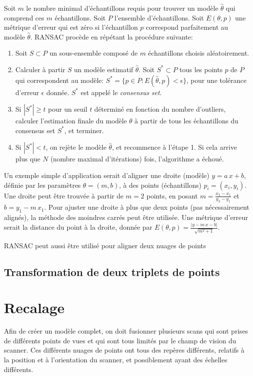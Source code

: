 \documentclass[a4paper,10pt]{scrreprt}
\begin{document}
Soit $m$ le nombre minimal d'échantillons requis pour trouver un modèle $\hat{\theta}$ qui comprend ces $m$ échantillons. Soit $P$ l'ensemble d'échantillons. Soit $E(\theta, p)$ une métrique d'erreur qui est zéro si l'échantillon $p$ correspond parfaitement au modèle $\hat{\theta}$. RANSAC procède en répétant la procédure suivante:
\begin{enumerate}
	\item Soit $S \subset P$ un sous-ensemble composé de $m$ échantillons choisis aléatoirement.
	\item Calculer à partir $S$ un modèle estimatif $\hat{\theta}$. Soit $S^* \subset P$ tous les points $p$ de $P$ qui correspondent au modèle: $S^* = \{ p \in P : E(\hat{\theta}, p) < \epsilon \}$, pour une tolérance d'erreur $\epsilon$ donnée. $S^*$ est appelé le \emph{consensus set}.
	\item Si $|S^*| \geq t$ pour un seuil $t$ déterminé en fonction du nombre d'outliers, calculer l'estimation finale du modèle $\theta$ à partir de tous les échantillons du consensus set $S^*$, et terminer.
	\item Si $|S^*| < t$, on rejète le modèle $\hat{\theta}$, et recommence à l'étape 1. Si cela arrive plus que $N$ (nombre maximal d'itérations) fois, l'algorithme a échoué.
\end{enumerate}

Un exemple simple d'application serait d'aligner une droite (modèle) $y = a \, x + b$, définie par les paramètres $\theta = (m,b)$, à des points (échantillons) $p_i = (x_i,y_i)$. Une droite peut être trouvée à partir de $m = 2$ points, en posant $m = \frac{x_2 - x_1}{y_2 - y_1}$ et $b = y_1 - m \, x_1$. Pour ajuster une droite à plus que deux points (pas nécessairement alignés), la méthode des moindres carrés peut être utilisée. Une métrique d'erreur serait la distance du point à la droite, donnée par $E(\theta, p) = \frac{|y - m\,x - b|}{\sqrt{m^2 + 1}}$.

RANSAC peut aussi être utilisé pour aligner deux nuages de points 

\subsection{Transformation de deux triplets de points}


\section{Recalage}
Afin de créer un modèle complet, on doit fusionner plusieurs scans qui sont prises de différents points de vues et qui sont tous limités par le champ de vision du scanner. Ces différents nuages de points ont tous des repères différents, relatifs à la position et à l'orientation du scanner, et possiblement ayant des échelles différents.
\end{document}
